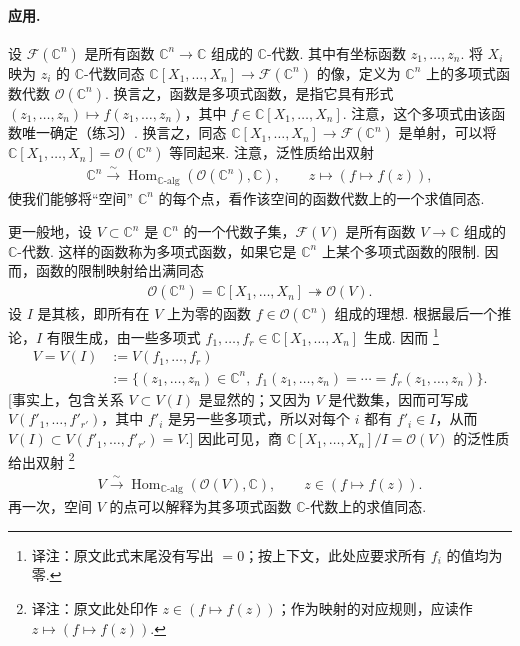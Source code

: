 \paragraph{应用.}
设 $\mathcal F(\mathbb C^n)$ 是所有函数 $\mathbb C^n\longrightarrow\mathbb C$ 组成的 $\mathbb C$-代数. 其中有坐标函数 $z_1,\ldots,z_n$. 将 $X_i$ 映为 $z_i$ 的 $\mathbb C$-代数同态 $\mathbb C[X_1,\ldots,X_n]\longrightarrow\mathcal F(\mathbb C^n)$ 的像，定义为 $\mathbb C^n$ 上的多项式函数代数 $\mathcal O(\mathbb C^n)$. 换言之，函数是多项式函数，是指它具有形式 $(z_1,\ldots,z_n)\longmapsto f(z_1,\ldots,z_n)$，其中 $f\in\mathbb C[X_1,\ldots,X_n]$. 注意，这个多项式由该函数唯一确定（练习）. 换言之，同态 $\mathbb C[X_1,\ldots,X_n]\longrightarrow\mathcal F(\mathbb C^n)$ 是单射，可以将 $\mathbb C[X_1,\ldots,X_n]=\mathcal O(\mathbb C^n)$ 等同起来. 注意，泛性质给出双射
\begin{align*}
\mathbb C^n\xrightarrow{\sim}\operatorname{Hom}_{\mathbb C\text{-}\mathrm{alg}}(\mathcal O(\mathbb C^n),\mathbb C),\qquad z\longmapsto(f\longmapsto f(z)),
\end{align*}
使我们能够将``空间'' $\mathbb C^n$ 的每个点，看作该空间的函数代数上的一个求值同态.

更一般地，设 $V\subset\mathbb C^n$ 是 $\mathbb C^n$ 的一个代数子集，$\mathcal F(V)$ 是所有函数 $V\longrightarrow\mathbb C$ 组成的 $\mathbb C$-代数. 这样的函数称为多项式函数，如果它是 $\mathbb C^n$ 上某个多项式函数的限制. 因而，函数的限制映射给出满同态
\begin{align*}
\mathcal O(\mathbb C^n)=\mathbb C[X_1,\ldots,X_n]\twoheadrightarrow\mathcal O(V).
\end{align*}
设 $I$ 是其核，即所有在 $V$ 上为零的函数 $f\in\mathcal O(\mathbb C^n)$ 组成的理想. 根据最后一个推论，$I$ 有限生成，由一些多项式 $f_1,\ldots,f_r\in\mathbb C[X_1,\ldots,X_n]$ 生成. 因而
\footnote{译注：原文此式末尾没有写出 $=0$；按上下文，此处应要求所有 $f_i$ 的值均为零.}
\begin{align*}
V=V(I)&:=V(f_1,\ldots,f_r)\\
&:=\{(z_1,\ldots,z_n)\in\mathbb C^n,\ f_1(z_1,\ldots,z_n)=\cdots=f_r(z_1,\ldots,z_n)\}.
\end{align*}
[事实上，包含关系 $V\subset V(I)$ 是显然的；又因为 $V$ 是代数集，因而可写成 $V(f'_1,\ldots,f'_{r'})$，其中 $f'_i$ 是另一些多项式，所以对每个 $i$ 都有 $f'_i\in I$，从而 $V(I)\subset V(f'_1,\ldots,f'_{r'})=V$.] 因此可见，商 $\mathbb C[X_1,\ldots,X_n]/I=\mathcal O(V)$ 的泛性质给出双射
\footnote{译注：原文此处印作 $z\in(f\mapsto f(z))$；作为映射的对应规则，应读作 $z\mapsto(f\mapsto f(z))$.}
\begin{align*}
V\xrightarrow{\sim}\operatorname{Hom}_{\mathbb C\text{-}\mathrm{alg}}(\mathcal O(V),\mathbb C),\qquad z\in(f\longmapsto f(z)).
\end{align*}
再一次，空间 $V$ 的点可以解释为其多项式函数 $\mathbb C$-代数上的求值同态.

